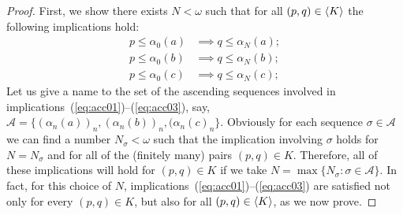 \begin{proof}
First, we show there exists $N < \omega$ such that 
for all $(p, q) \in \langle K\rangle$ 
the following implications hold:
\begin{align}
  p \leq \alpha_0(a) &\implies q \leq \alpha_N(a); \label{eq:acc01}\\
  p \leq \alpha_0(b) &\implies q \leq \alpha_N(b); \label{eq:acc02}\\ 
  p \leq \alpha_0(c) &\implies q \leq \alpha_N(c); \label{eq:acc03}
\end{align}
Let us give a name to the set of the ascending 
sequences involved in implications~(\ref{eq:acc01})--(\ref{eq:acc03}), say, 
$\mathcal A = \{(\alpha_n(a))_n, (\alpha_n(b))_n, (\alpha_n(c)_n\}$.
Obviously for each sequence $\sigma \in \mathcal A$
we can find a number $N_\sigma < \omega$ such that the implication involving $\sigma$
holds for $N = N_\sigma$ and for all of the (finitely many) pairs $(p,q) \in K$.  
Therefore, all of these implications will hold for $(p, q) \in K$ if we take 
$N = \max \{N_{\sigma} : \sigma \in \mathcal A\}$. %
In fact, for this choice of $N$, implications~(\ref{eq:acc01})--(\ref{eq:acc03}) 
are satisfied not only for every $(p, q) \in K$, but also for all $(p, q) \in \langle K\rangle$,
as we now prove.

    

\end{proof}
